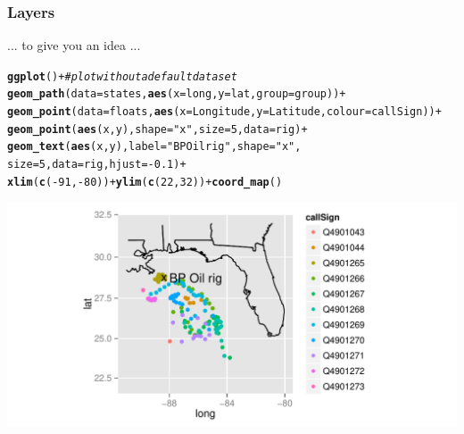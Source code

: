 \documentclass{beamer}\usepackage[]{graphicx}\usepackage[]{color}
\makeatletter
\newcommand{\hlnum}[1]{\textcolor[rgb]{0.686,0.059,0.569}{#1}}%
\newcommand{\hlstr}[1]{\textcolor[rgb]{0.192,0.494,0.8}{#1}}%
\newcommand{\hlcom}[1]{\textcolor[rgb]{0.678,0.584,0.686}{\textit{#1}}}%
\newcommand{\hlopt}[1]{\textcolor[rgb]{0,0,0}{#1}}%
\newcommand{\hlstd}[1]{\textcolor[rgb]{0.345,0.345,0.345}{#1}}%
\newcommand{\hlkwc}[1]{\textcolor[rgb]{0.333,0.667,0.333}{#1}}%
\newcommand{\hlkwd}[1]{\textcolor[rgb]{0.737,0.353,0.396}{\textbf{#1}}}%
\newenvironment{kframe}{%
 \def\at@end@of@kframe{}%
 \ifinner\ifhmode%
  \def\at@end@of@kframe{\end{minipage}}%
  \begin{minipage}{\columnwidth}%
 \fi\fi%
 \def\FrameCommand##1{\hskip\@totalleftmargin \hskip-\fboxsep
 \colorbox{shadecolor}{##1}\hskip-\fboxsep
     \hskip-\linewidth \hskip-\@totalleftmargin \hskip\columnwidth}%
 \MakeFramed {\advance\hsize-\width
   \@totalleftmargin\z@ \linewidth\hsize
   \@setminipage}}%
 {\par\unskip\endMakeFramed%
 \at@end@of@kframe}
\newenvironment{knitrout}{}{} %
\makeatother
\begin{document}
\begin{frame}[fragile]
\frametitle{Layers}
\vspace{-14pt}\hfill... to give you an idea ... \vspace{-9pt}
\begin{knitrout}\scriptsize
{}\color{fgcolor}\begin{kframe}
\begin{alltt}
\hlkwd{ggplot}\hlstd{()} \hlopt{+}   \hlcom{# plot without a default data set}
\hlkwd{geom_path}\hlstd{(}\hlkwc{data}\hlstd{=states,} \hlkwd{aes}\hlstd{(}\hlkwc{x}\hlstd{=long,} \hlkwc{y}\hlstd{=lat,} \hlkwc{group}\hlstd{=group))} \hlopt{+}
\hlkwd{geom_point}\hlstd{(}\hlkwc{data}\hlstd{=floats,} \hlkwd{aes}\hlstd{(}\hlkwc{x}\hlstd{=Longitude,} \hlkwc{y}\hlstd{=Latitude,} \hlkwc{colour}\hlstd{=callSign))} \hlopt{+}
\hlkwd{geom_point}\hlstd{(}\hlkwd{aes}\hlstd{(x, y),} \hlkwc{shape}\hlstd{=}\hlstr{"x"}\hlstd{,} \hlkwc{size}\hlstd{=}\hlnum{5}\hlstd{,} \hlkwc{data}\hlstd{=rig)} \hlopt{+}
\hlkwd{geom_text}\hlstd{(}\hlkwd{aes}\hlstd{(x, y),} \hlkwc{label}\hlstd{=}\hlstr{"BP Oil rig"}\hlstd{,} \hlkwc{shape}\hlstd{=}\hlstr{"x"}\hlstd{,}
          \hlkwc{size}\hlstd{=}\hlnum{5}\hlstd{,} \hlkwc{data}\hlstd{=rig,} \hlkwc{hjust} \hlstd{=} \hlopt{-}\hlnum{0.1}\hlstd{)} \hlopt{+}
\hlkwd{xlim}\hlstd{(}\hlkwd{c}\hlstd{(}\hlopt{-}\hlnum{91}\hlstd{,} \hlopt{-}\hlnum{80}\hlstd{))} \hlopt{+} \hlkwd{ylim}\hlstd{(}\hlkwd{c}\hlstd{(}\hlnum{22}\hlstd{,}\hlnum{32}\hlstd{))} \hlopt{+} \hlkwd{coord_map}\hlstd{()}
\end{alltt}
\end{kframe}

{\centering \includegraphics[width=.9\linewidth]{figure/layers1} 

}



\end{knitrout}

\end{frame}
\end{document}
